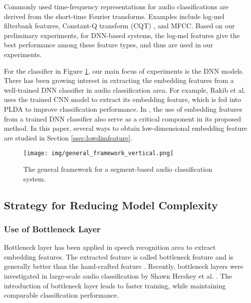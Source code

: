 \documentclass{article}
\begin{document}
Commonly used time-frequency representations for audio classifications are derived from the short-time Fourier transforms. Examples include log-mel filterbank features, Constant-Q transform (CQT) \cite{calCQT}, and MFCC. Based on our preliminary experiments, for DNN-based systems, the log-mel features give the best performance among these feature types, and thus are used in our experiments.

For the classifier in Figure \ref{generalframework}, our main focus of experiments is the DNN models. There has been growing interest in extracting the embedding features from a well-trained DNN classifier in audio classification area. For example, Rakib et al. \cite{cnnsvplda} uses the trained CNN model to extract its embedding feature, which is fed into PLDA to improve classification performance. In \cite{Mun2017}, the use of embedding features from a trained DNN classifier also serve as a critical component in its proposed method. In this paper, several ways to obtain low-dimensional embedding feature are studied in Section \ref{ssec:lowdimfeature}.


\begin{figure}[h]
  \centering
  \texttt{[image: img/general\_framework\_vertical.png]}
  \caption{The general framework for a segment-based audio classification system.}
  \label{generalframework}
\end{figure}


\subsection{Strategy for Reducing Model Complexity}
\label{ssec:strategies}

\subsubsection{Use of Bottleneck Layer}
\label{sssec:bottleneck}


Bottleneck layer has been applied in speech recognition area to extract embedding features. The extracted feature is called bottleneck feature and is generally better than the hand-crafted feature \cite{bottleneck}. Recently, bottleneck layers were investigated in large-scale audio classification by Shawn Hershey et al. \cite{googlecnnaudioclass}. The introduction of bottleneck layer leads to faster training, while maintaining comparable classification performance.
\end{document}
